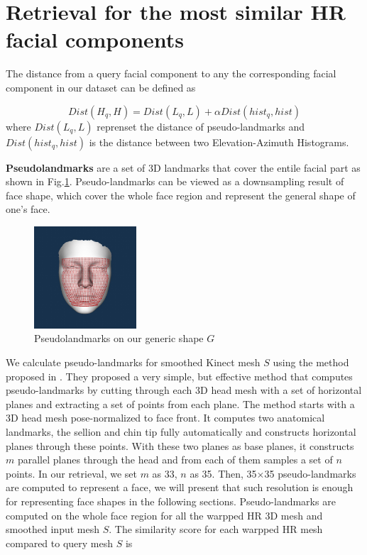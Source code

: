 \documentclass[annual]{acmsiggraph}
\begin{document}
\section{Retrieval for the most similar HR facial components}
The distance from a query facial component to any the corresponding facial component in our dataset can be defined as

\begin{equation}
Dist(H_q,H)=Dist(L_q,L)+{\alpha}Dist(hist_q,hist)
\end{equation}
where $Dist(L_q,L)$ reprenset the distance of pseudo-landmarks and $Dist(hist_q,hist)$ is the distance between two Elevation-Azimuth Histograms.

\textbf{Pseudolandmarks} are a set of 3D landmarks that cover the entile facial part as shown in Fig.\ref{pseudolandmarks}. Pseudo-landmarks can be viewed as a downsampling result of face shape, which cover the whole face region and represent the general shape of one's face.
\begin{figure}[ht]
  \centering
  \includegraphics[width=1.5in]{images/pseudolandmarks}
  \caption{Pseudolandmarks on our generic shape $G$}\label{pseudolandmarks}
\end{figure}

We calculate pseudo-landmarks for smoothed Kinect mesh $S$ using the method proposed in \cite{pseudo}. They proposed a very simple, but effective method that computes pseudo-landmarks by cutting through each 3D head mesh with a set of horizontal planes and extracting a set of points from each plane. The method starts with a 3D head mesh pose-normalized to face front. It computes two anatomical landmarks, the sellion and chin tip fully automatically and constructs horizontal planes through these points. With these two planes as base planes, it constructs $m$ parallel planes through the head and from each of them samples a set of $n$ points. In our retrieval, we set $m$ as 33, $n$ as 35. Then, 35$\times$35 pseudo-landmarks are computed to represent a face, we will present that such resolution is enough for representing face shapes in the following sections.
Pseudo-landmarks are computed on the whole face region for all the warpped HR 3D mesh and smoothed input mesh $S$. The similarity score for each warpped HR mesh compared to query mesh $S$ is 
\end{document}
